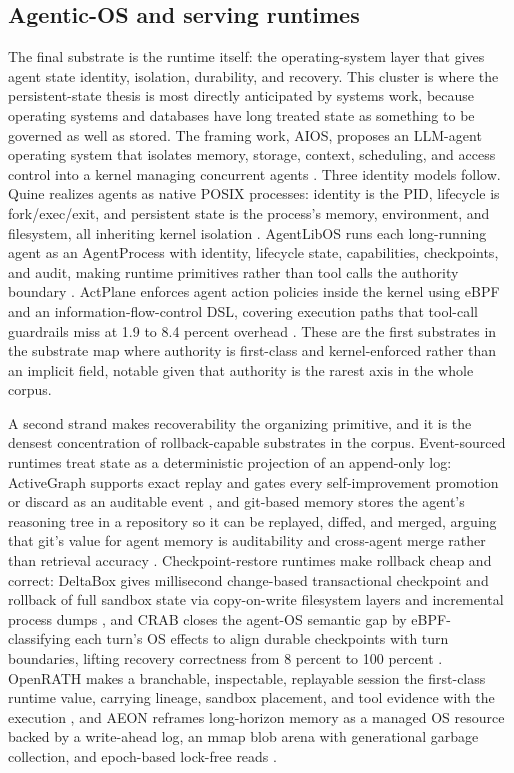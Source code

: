 \subsection{Agentic-OS and serving runtimes}

The final substrate is the runtime itself: the operating-system layer that gives agent state identity, isolation, durability, and recovery. This cluster is where the persistent-state thesis is most directly anticipated by systems work, because operating systems and databases have long treated state as something to be governed as well as stored. The framing work, AIOS, proposes an LLM-agent operating system that isolates memory, storage, context, scheduling, and access control into a kernel managing concurrent agents \citep{mei2024aios}. Three identity models follow. Quine realizes agents as native POSIX processes: identity is the PID, lifecycle is fork/exec/exit, and persistent state is the process's memory, environment, and filesystem, all inheriting kernel isolation \citep{ke2026quine}. AgentLibOS runs each long-running agent as an AgentProcess with identity, lifecycle state, capabilities, checkpoints, and audit, making runtime primitives rather than tool calls the authority boundary \citep{zhang2026agentlibos}. ActPlane enforces agent action policies inside the kernel using eBPF and an information-flow-control DSL, covering execution paths that tool-call guardrails miss at 1.9 to 8.4 percent overhead \citep{zheng2026actplane}. These are the first substrates in the substrate map where authority is first-class and kernel-enforced rather than an implicit field, notable given that authority is the rarest axis in the whole corpus.

A second strand makes recoverability the organizing primitive, and it is the densest concentration of rollback-capable substrates in the corpus. Event-sourced runtimes treat state as a deterministic projection of an append-only log: ActiveGraph supports exact replay and gates every self-improvement promotion or discard as an auditable event \citep{nakajima2026regimes}, and git-based memory stores the agent's reasoning tree in a repository so it can be replayed, diffed, and merged, arguing that git's value for agent memory is auditability and cross-agent merge rather than retrieval accuracy \citep{shekar2026gitofthoughts,wu2025gitcontextcontroller}. Checkpoint-restore runtimes make rollback cheap and correct: DeltaBox gives millisecond change-based transactional checkpoint and rollback of full sandbox state via copy-on-write filesystem layers and incremental process dumps \citep{dong2026deltabox}, and CRAB closes the agent-OS semantic gap by eBPF-classifying each turn's OS effects to align durable checkpoints with turn boundaries, lifting recovery correctness from 8 percent to 100 percent \citep{wu2026crab}. OpenRATH makes a branchable, inspectable, replayable session the first-class runtime value, carrying lineage, sandbox placement, and tool evidence with the execution \citep{wen2026openrath}, and AEON reframes long-horizon memory as a managed OS resource backed by a write-ahead log, an mmap blob arena with generational garbage collection, and epoch-based lock-free reads \citep{arslan2026aeon}.

